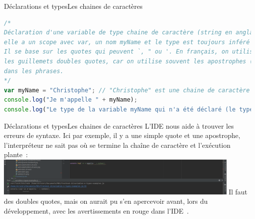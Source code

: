 \documentclass{beamer}
\begin{document}
    \begin{frame}[fragile]{Déclarations et types}{Les chaines de caractères}
        \begin{lstlisting}[language=JavaScript,title={\scriptsize{Script JavaScript}}]
/*
Déclaration d'une variable de type chaine de caractère (string en anglais),
elle a un scope avec var, un nom myName et le type est toujours inféré par le langage.
Il se base sur les quotes qui peuvent `, " ou '. En français, on utilise souvent
les guillemets doubles quotes, car on utilise souvent les apostrophes (simple quote)
dans les phrases.
*/
var myName = "Christophe"; // "Christophe" est une chaine de caractère (string en anglais)
console.log("Je m'appelle " + myName);
console.log("Le type de la variable myName qui n'a été déclaré (le type) est " + typeof myName);
        \end{lstlisting}
    \end{frame}

    \begin{frame}{Déclarations et types}{Les chaines de caractères}
        L'IDE nous aide à trouver les erreurs de syntaxe.
        \bigbreak
        Ici par exemple, il y a une simple quote et une apostrophe, l'interpréteur ne sait pas où se termine la chaîne de caractère et l'exécution plante~:
        \bigbreak
        \centering
        \includegraphics[width=12cm]{image/wrong-quote}
        \pause
        \bigbreak
        \flushleft
        Il faut des doubles quotes, mais on aurait pu s'en apercevoir avant, lors du développement, avec les avertissements en rouge dans l'IDE~.
    \end{frame}
\end{document}
